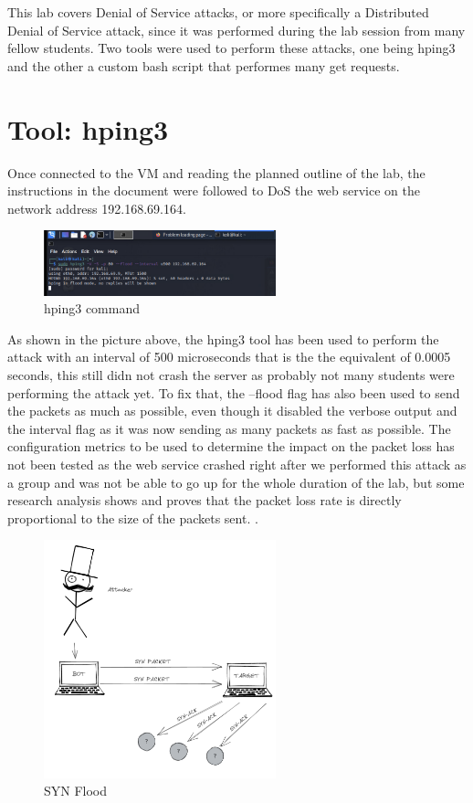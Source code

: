This lab covers Denial of Service attacks, or more specifically a Distributed
Denial of Service attack, since it was performed during the lab session from
many fellow students. Two tools were used to perform these attacks, one being
hping3 and the other a custom bash script that performes many get requests.

\section{Tool: hping3}
\label{s:Tool-hping3}
Once connected to the VM and reading the planned outline of the lab, the
instructions in the document were followed to DoS the web service on the network
address 192.168.69.164.
\begin{figure}[H]
  \centering
  \includegraphics[width=0.6\textwidth]{figures/ddosscommand}
  \caption{hping3 command}
  \label{f:hping3-command}
\end{figure}
As shown in the picture above, the hping3 tool has been used to perform the
attack with an interval of 500 microseconds that is the the equivalent of 0.0005
seconds, this still didn not crash the server as probably not many students were
performing the attack yet. To fix that, the --flood flag has also been used to
send the packets as much as possible, even though it disabled the verbose output
and the interval flag as it was now sending as many packets as fast as possible.
The configuration metrics to be used to determine the impact on the packet loss
has not been tested as the web service crashed right after we performed this
attack as a group and was not be able to go up for the whole duration of the lab,
but some research analysis shows and proves that the packet loss rate is
directly proportional to the size of the packets sent.
\citep{liangDenialServiceAttack2016}.
\begin{figure}[H]
  \centering
  \includegraphics[width=0.6\textwidth]{figures/synflood}
  \caption{SYN Flood}
  \label{f:synflood}
\end{figure}

